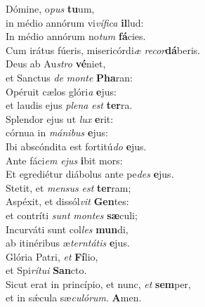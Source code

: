 \evenverse Dómine, o\textit{pus} \textbf{tu}um,~\*\\
\evenverse in médio annórum vi\textit{ví}\textit{fi}\textit{ca} \textbf{il}lud:\\
\oddverse In médio annórum no\textit{tum} \textbf{fá}cies.~\*\\
\oddverse Cum irátus fúeris, misericórdi\textit{æ} \textit{re}\textit{cor}\textbf{dá}beris.\\
\evenverse Deus ab Au\textit{stro} \textbf{vé}niet,~\*\\
\evenverse et Sanctus \textit{de} \textit{mon}\textit{te} \textbf{Pha}ran:\\
\oddverse Opéruit cælos glóri\textit{a} \textbf{e}jus:~\*\\
\oddverse et laudis ejus \textit{ple}\textit{na} \textit{est} \textbf{ter}ra.\\
\evenverse Splendor ejus ut \textit{lux} \textbf{e}rit:~\*\\
\evenverse córnua in \textit{má}\textit{ni}\textit{bus} \textbf{e}jus:\\
\oddverse Ibi abscóndita est fortitú\textit{do} \textbf{e}jus.~\*\\
\oddverse Ante fáci\textit{em} \textit{e}\textit{jus} \textbf{i}bit mors:\\
\evenverse Et egrediétur diábolus ante pe\textit{des} \textbf{e}jus.~\*\\
\evenverse Stetit, et \textit{men}\textit{sus} \textit{est} \textbf{ter}ram;\\
\oddverse Aspéxit, et dissól\textit{vit} \textbf{Gen}tes:~\*\\
\oddverse et contríti \textit{sunt} \textit{mon}\textit{tes} \textbf{sæ}culi;\\
\evenverse Incurváti sunt col\textit{les} \textbf{mun}di,~\*\\
\evenverse ab itinéribus æ\textit{ter}\textit{ntá}\textit{tis} \textbf{e}jus.\\
\oddverse Glória Patri, \textit{et} \textbf{Fí}lio,~\*\\
\oddverse et Spi\textit{rí}\textit{tu}\textit{i} \textbf{San}cto.\\
\evenverse Sicut erat in princípio, et nunc, \textit{et} \textbf{sem}per,~\*\\
\evenverse et in sǽcula sæ\textit{cu}\textit{ló}\textit{rum}. \textbf{A}men.\\
